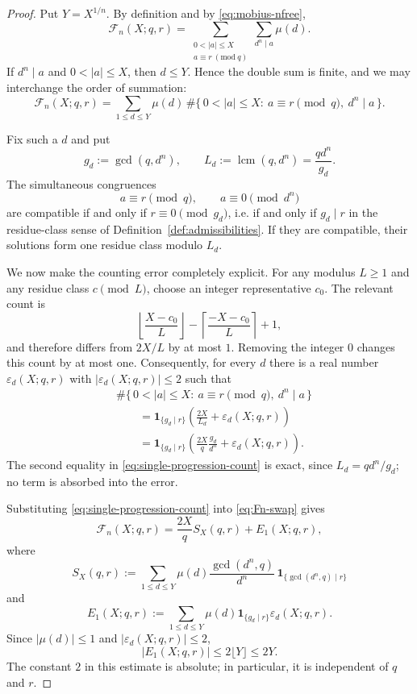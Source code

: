 \documentclass[12pt,a4paper,oneside]{amsart}
\theoremstyle{definition}
\begin{document}
\begin{proof}
Put $Y=X^{1/n}$. By definition and by \eqref{eq:mobius-nfree},
\[
\mathcal F_n(X;q,r)
=\sum_{\substack{0<|a|\le X\\ a\equiv r\ (\mathrm{mod}\ q)}}
 \sum_{d^n\mid a}\mu(d).
\]
If $d^n\mid a$ and $0<|a|\le X$, then $d\le Y$. Hence the double sum is finite, and we may
interchange the order of summation:
\begin{equation}\label{eq:Fn-swap}
\mathcal F_n(X;q,r)
=\sum_{1\le d\le Y}\mu(d)\,
\#\bigl\{\,0<|a|\le X:\ a\equiv r\pmod q,\ d^n\mid a\,\bigr\}.
\end{equation}

Fix such a $d$ and put
\[
g_d:=\gcd(q,d^n),\qquad
L_d:=\operatorname{lcm}(q,d^n)=\frac{qd^n}{g_d}.
\]
The simultaneous congruences
\[
a\equiv r\pmod q,
\qquad a\equiv0\pmod{d^n}
\]
are compatible if and only if $r\equiv0\pmod{g_d}$, i.e. if and only if $g_d\mid r$ in the
residue-class sense of Definition~\ref{def:admissibilities}. If they are compatible, their
solutions form one residue class modulo $L_d$.

We now make the counting error completely explicit. For any modulus $L\ge1$ and any residue
class $c\pmod L$, choose an integer representative $c_0$. The relevant count is
\[
\left\lfloor\frac{X-c_0}{L}\right\rfloor
-\left\lceil\frac{-X-c_0}{L}\right\rceil+1,
\]
and therefore differs from $2X/L$ by at most $1$. Removing the integer $0$ changes this count
by at most one. Consequently, for every $d$ there is a real number $\varepsilon_d(X;q,r)$ with
$|\varepsilon_d(X;q,r)|\le2$ such that
\begin{equation}\label{eq:single-progression-count}
\begin{aligned}
&\#\bigl\{\,0<|a|\le X:\ a\equiv r\pmod q,\ d^n\mid a\,\bigr\}\\
&\qquad=
\mathbf 1_{\{g_d\mid r\}}
\left(\frac{2X}{L_d}+\varepsilon_d(X;q,r)\right)\\
&\qquad=
\mathbf 1_{\{g_d\mid r\}}
\left(\frac{2X}{q}\frac{g_d}{d^n}+\varepsilon_d(X;q,r)\right).
\end{aligned}
\end{equation}
The second equality in \eqref{eq:single-progression-count} is exact, since
$L_d=qd^n/g_d$; no term is absorbed into the error.

Substituting \eqref{eq:single-progression-count} into \eqref{eq:Fn-swap} gives
\begin{equation}\label{eq:Fn-SX}
\mathcal F_n(X;q,r)=\frac{2X}{q}S_X(q,r)+E_1(X;q,r),
\end{equation}
where
\[
S_X(q,r):=
\sum_{1\le d\le Y}
\mu(d)\frac{\gcd(d^n,q)}{d^n}\,
\mathbf 1_{\{\gcd(d^n,q)\mid r\}}
\]
and
\[
E_1(X;q,r):=
\sum_{1\le d\le Y}
\mu(d)\mathbf 1_{\{g_d\mid r\}}\varepsilon_d(X;q,r).
\]
Since $|\mu(d)|\le1$ and $|\varepsilon_d(X;q,r)|\le2$,
\begin{equation}\label{eq:E1-bound}
|E_1(X;q,r)|\le2\lfloor Y\rfloor\le2Y.
\end{equation}
The constant $2$ in this estimate is absolute; in particular, it is independent of $q$ and $r$.


\end{proof}
\end{document}

